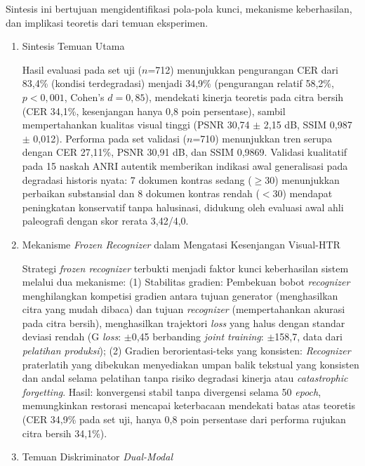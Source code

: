 \documentclass[12pt,a4paper]{article}
\begin{document}
Sintesis ini bertujuan mengidentifikasi pola-pola kunci, mekanisme keberhasilan, dan implikasi teoretis dari temuan eksperimen.
\begin{enumerate}[leftmargin=1.5em, labelsep=0.5em, itemindent=0pt, label=\arabic*., topsep=0pt, partopsep=0pt]
    \item Sintesis Temuan Utama
    
    Hasil evaluasi pada set uji ($n$=712) menunjukkan pengurangan CER dari 83,4\% (kondisi terdegradasi) menjadi 34,9\% (pengurangan relatif 58,2\%, $p<0,001$, Cohen's $d=0,85$), mendekati kinerja teoretis pada citra bersih (CER 34,1\%, kesenjangan hanya 0,8 poin persentase), sambil mempertahankan kualitas visual tinggi (PSNR 30,74 $\pm$ 2,15 dB, SSIM 0,987 $\pm$ 0,012). Performa pada set validasi ($n$=710) menunjukkan tren serupa dengan CER 27,11\%, PSNR 30,91 dB, dan SSIM 0,9869. Validasi kualitatif pada 15 naskah ANRI autentik memberikan indikasi awal generalisasi pada degradasi historis nyata: 7 dokumen kontras sedang ($\geq$30) menunjukkan perbaikan substansial dan 8 dokumen kontras rendah ($<$30) mendapat peningkatan konservatif tanpa halusinasi, didukung oleh evaluasi awal ahli paleografi dengan skor rerata 3,42/4,0.

    \item Mekanisme \textit{Frozen Recognizer} dalam Mengatasi Kesenjangan Visual-HTR
    
    Strategi \textit{frozen recognizer} terbukti menjadi faktor kunci keberhasilan sistem melalui dua mekanisme: (1) Stabilitas gradien: Pembekuan bobot \textit{recognizer} menghilangkan kompetisi gradien antara tujuan generator (menghasilkan citra yang mudah dibaca) dan tujuan \textit{recognizer} (mempertahankan akurasi pada citra bersih), menghasilkan trajektori \textit{loss} yang halus dengan standar deviasi rendah (G \textit{loss}: $\pm$0,45 berbanding \textit{joint training}: $\pm$158,7, data dari \textit{pelatihan produksi}); (2) Gradien berorientasi-teks yang konsisten: \textit{Recognizer} praterlatih yang dibekukan menyediakan umpan balik tekstual yang konsisten dan andal selama pelatihan tanpa risiko degradasi kinerja atau \textit{catastrophic forgetting}. Hasil: konvergensi stabil tanpa divergensi selama 50 \textit{epoch}, memungkinkan restorasi mencapai keterbacaan mendekati batas atas teoretis (CER 34,9\% pada set uji, hanya 0,8 poin persentase dari performa rujukan citra bersih 34,1\%).

    \item Temuan Diskriminator \textit{Dual-Modal}
    

\end{enumerate}
\end{document}
